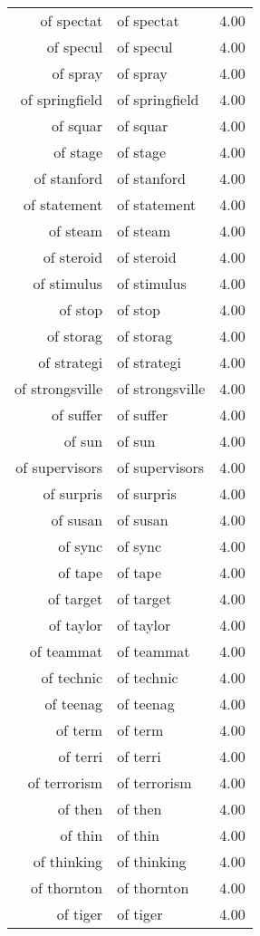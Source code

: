 \begin{table}[ht]
\begin{tabular}{rlr}
  of spectat & of spectat & 4.00 \\ 
  of specul & of specul & 4.00 \\ 
  of spray & of spray & 4.00 \\ 
  of springfield & of springfield & 4.00 \\ 
  of squar & of squar & 4.00 \\ 
  of stage & of stage & 4.00 \\ 
  of stanford & of stanford & 4.00 \\ 
  of statement & of statement & 4.00 \\ 
  of steam & of steam & 4.00 \\ 
  of steroid & of steroid & 4.00 \\ 
  of stimulus & of stimulus & 4.00 \\ 
  of stop & of stop & 4.00 \\ 
  of storag & of storag & 4.00 \\ 
  of strategi & of strategi & 4.00 \\ 
  of strongsville & of strongsville & 4.00 \\ 
  of suffer & of suffer & 4.00 \\ 
  of sun & of sun & 4.00 \\ 
  of supervisors & of supervisors & 4.00 \\ 
  of surpris & of surpris & 4.00 \\ 
  of susan & of susan & 4.00 \\ 
  of sync & of sync & 4.00 \\ 
  of tape & of tape & 4.00 \\ 
  of target & of target & 4.00 \\ 
  of taylor & of taylor & 4.00 \\ 
  of teammat & of teammat & 4.00 \\ 
  of technic & of technic & 4.00 \\ 
  of teenag & of teenag & 4.00 \\ 
  of term & of term & 4.00 \\ 
  of terri & of terri & 4.00 \\ 
  of terrorism & of terrorism & 4.00 \\ 
  of then & of then & 4.00 \\ 
  of thin & of thin & 4.00 \\ 
  of thinking & of thinking & 4.00 \\ 
  of thornton & of thornton & 4.00 \\ 
  of tiger & of tiger & 4.00 \\ 

\end{tabular}
\end{table}
